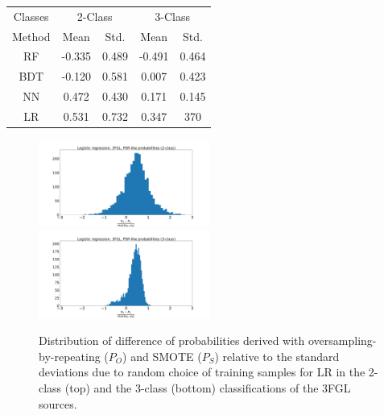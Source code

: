 \documentclass{aa}
\begin{document}
\begin{appendix}
\begin{table}[!h]
\begin{tabular}{c c c c c}
\hline
\hline
Classes&\multicolumn{2}{c}{2-Class}&\multicolumn{2}{c}{3-Class}\\
Method & Mean&Std.&Mean&Std.\\
\hline
RF& -0.335 & 0.489&-0.491&0.464\\
\hline
BDT&-0.120&0.581 &0.007&0.423\\
\hline
NN&0.472&0.430&0.171&0.145\\
\hline
LR&0.531&0.732&0.347&370\\
\end{tabular}
\vspace{2mm}
\end{table}
\begin{figure}[h!]
\centering
\hspace*{-0.5cm}
\includegraphics[width=0.5\textwidth]{plots/hist_diff_smote_LR_3FGL_2class.pdf}
\hspace*{-0.5cm}
\includegraphics[width=0.5\textwidth]{plots/hist_diff_smote_LR_3FGL_3class.pdf}
\caption{Distribution of difference  of probabilities derived with oversampling-by-repeating ($P_O$) and SMOTE ($P_S$) 
relative to the standard deviations due to random choice of training samples
for LR in the 2-class (top) and the 3-class (bottom) classifications of the 3FGL sources.
}
\label{fig:OvsS_3FGL_PSR}
\end{figure}


\end{appendix}
\end{document}
